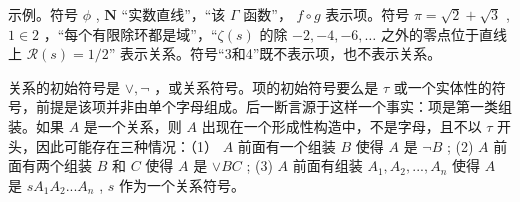示例。符号 \(\phi\) , \(\mathbf{N}\) “实数直线”，“该 \(\Gamma\) 函数”， \(f \circ g\) 表示项。符号 \(\pi = \sqrt{2} + \sqrt{3}\) , \(1 \in 2\) ，“每个有限除环都是域”，“\(\zeta(s)\) 的除 \(-2, -4, -6, \ldots\) 之外的零点位于直线上 \(\mathcal{R}(s) = 1/2\)'' 表示关系。符号“3和4”既不表示项，也不表示关系。

关系的初始符号是 \(\vee, \neg\) ，或关系符号。项的初始符号要么是 \(\tau\) 或一个实体性的符号，前提是该项并非由单个字母组成。后一断言源于这样一个事实：项是第一类组装。如果 \(A\) 是一个关系，则 \(A\) 出现在一个形成性构造中，不是字母，且不以 \(\tau\) 开头，因此可能存在三种情况：（1） \(A\) 前面有一个组装 \(B\) 使得 \(A\) 是 \(\neg B\) ; (2) \(A\) 前面有两个组装 \(B\) 和 \(C\) 使得 \(A\) 是 \(\vee BC\) ; (3) \(A\) 前面有组装 \(A_1, A_2, ..., A_n\) 使得 \(A\) 是 \(sA_1A_2 ... A_n\) , \(s\) 作为一个关系符号。

